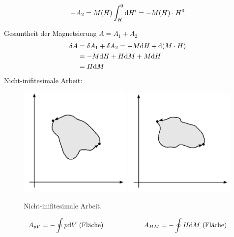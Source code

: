\begin{enumerate}[a)]
\begin{enumerate}[i)]
\begin{equation}
            - A_2 = M(H) \int_{H}^{0} \mathrm{d} H' = - M(H) \cdot H^0
        \end{equation}
    \end{enumerate}
    Gesamtheit der Magnetsierung $A = A_1 + A_2$
    \begin{equation}
        \begin{split}
            \delta A &= \delta A_1 + \delta A_2 = - M \mathrm{d} H + \mathrm{d}(M \cdot H) \\
            &= - M \mathrm{d} H + H \mathrm{d} M + M \mathrm{d} H \\
            &= H \mathrm{d} M
        \end{split}
    \end{equation}
    Nicht-inifitesimale Arbeit:
    \begin{figure}[H]
        \begin{center}
            \includegraphics[width=0.49\textwidth]{../img/notInfWork_p-V.pdf}
            \includegraphics[width=0.49\textwidth]{../img/notInfWork_H-M.pdf}
            \caption{Nicht-inifitesimale Arbeit.}  %
            \label{img:label}
        \end{center}
    \end{figure}
    \begin{equation}
        A_{pV} = - \oint p \difd V \text{  (Fläche)} \qquad \qquad \qquad A_{HM} = - \oint H \difd M \text{  (Fläche)}

\end{equation}
\end{enumerate}
